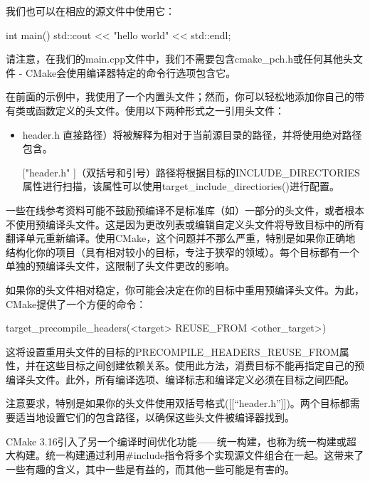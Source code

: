 我们也可以在相应的源文件中使用它：


\begin{cmake}
int main() {
    std::cout << "hello world" << std::endl;
}
\end{cmake}

请注意，在我们的main.cpp文件中，我们不需要包含cmake\_pch.h或任何其他头文件 - CMake会使用编译器特定的命令行选项包含它。

在前面的示例中，我使用了一个内置头文件；然而，你可以轻松地添加你自己的带有类或函数定义的头文件。使用以下两种形式之一引用头文件：

\begin{itemize}
\item
header.h 直接路径）将被解释为相对于当前源目录的路径，并将使用绝对路径包含。

\item
[["header.h"]]（双括号和引号）路径将根据目标的INCLUDE\_DIRECTORIES属性进行扫描，该属性可以使用target\_include\_directiories()进行配置。
\end{itemize}

一些在线参考资料可能不鼓励预编译不是标准库（如）一部分的头文件，或者根本不使用预编译头文件。这是因为更改列表或编辑自定义头文件将导致目标中的所有翻译单元重新编译。使用CMake，这个问题并不那么严重，特别是如果你正确地结构化你的项目（具有相对较小的目标，专注于狭窄的领域）。每个目标都有一个单独的预编译头文件，这限制了头文件更改的影响。

如果你的头文件相对稳定，你可能会决定在你的目标中重用预编译头文件。为此，CMake提供了一个方便的命令：

\begin{shell}
target_precompile_headers(<target> REUSE_FROM <other_target>)
\end{shell}

这将设置重用头文件的目标的PRECOMPILE\_HEADERS\_REUSE\_FROM属性，并在这些目标之间创建依赖关系。使用此方法，消费目标不能再指定自己的预编译头文件。此外，所有编译选项、编译标志和编译定义必须在目标之间匹配。

注意要求，特别是如果你的头文件使用双括号格式([[“header.h”]])。两个目标都需要适当地设置它们的包含路径，以确保这些头文件被编译器找到。


CMake 3.16引入了另一个编译时间优化功能——统一构建，也称为统一构建或超大构建。统一构建通过利用\#include指令将多个实现源文件组合在一起。这带来了一些有趣的含义，其中一些是有益的，而其他一些可能是有害的。

